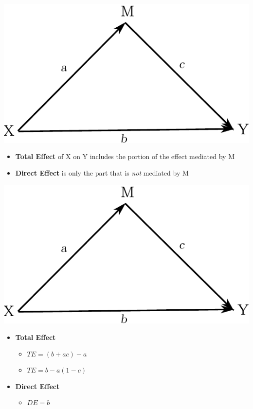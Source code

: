 \documentclass[xcolor=dvipsnames]{beamer}
\begin{document}
\begin{frame}{}
\includegraphics{arrow_diag_2.pdf}
\begin{itemize}
	\item \textbf{Total Effect} of X on Y includes the portion of the effect
	mediated by M
	\item \textbf{Direct Effect} is only the part that is \textit{not} mediated
	by M
\end{itemize} 
\end{frame}

\begin{frame}{}
\includegraphics{arrow_diag_2.pdf}
\begin{itemize}
	\item \textbf{Total Effect} 
	\begin{itemize} 
		\item $TE = (b + ac) - a$ 
		\item $TE = b - a(1	- c)$
	\end{itemize}
	\item \textbf{Direct Effect}
	\begin{itemize} 
		\item $DE = b$
	\end{itemize} 
\end{itemize} 
\end{frame}
\end{document}
